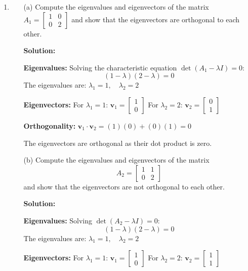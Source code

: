 \documentclass{article}
\begin{document}
\begin{enumerate}
\item
    \begin{enumerate}
    \item[(a)] Compute the eigenvalues and eigenvectors of the matrix 
    $A_1 = \begin{bmatrix}
    1 & 0 \\
    0 & 2
    \end{bmatrix}$
    and show that the eigenvectors are orthogonal to each other.

    \textbf{Solution:}

    \textbf{Eigenvalues:}
    Solving the characteristic equation $\det(A_1 - \lambda I) = 0$:
    \[
    (1 - \lambda)(2 - \lambda) = 0
    \]
    The eigenvalues are: $\lambda_1 = 1, \quad \lambda_2 = 2$

    \textbf{Eigenvectors:}
    For $\lambda_1 = 1$: $\mathbf{v}_1 = \begin{bmatrix} 1 \\ 0 \end{bmatrix}$
    For $\lambda_2 = 2$: $\mathbf{v}_2 = \begin{bmatrix} 0 \\ 1 \end{bmatrix}$

    \textbf{Orthogonality:}
    $\mathbf{v}_1 \cdot \mathbf{v}_2 = (1)(0) + (0)(1) = 0$
    
    The eigenvectors are orthogonal as their dot product is zero.

    \item[(b)] Compute the eigenvalues and eigenvectors of the matrix
    \[
    A_2 = \begin{bmatrix}
    1 & 1 \\
    0 & 2
    \end{bmatrix}
    \]
    and show that the eigenvectors are not orthogonal to each other.

    \textbf{Solution:}

    \textbf{Eigenvalues:}
    Solving $\det(A_2 - \lambda I) = 0$:
    \[
    (1 - \lambda)(2 - \lambda) = 0
    \]
    The eigenvalues are: $\lambda_1 = 1, \quad \lambda_2 = 2$

    \textbf{Eigenvectors:}
    For $\lambda_1 = 1$: $\mathbf{v}_1 = \begin{bmatrix} 1 \\ 0 \end{bmatrix}$
    For $\lambda_2 = 2$: $\mathbf{v}_2 = \begin{bmatrix} 1 \\ 1 \end{bmatrix}$


\end{enumerate}
\end{enumerate}
\end{document}
